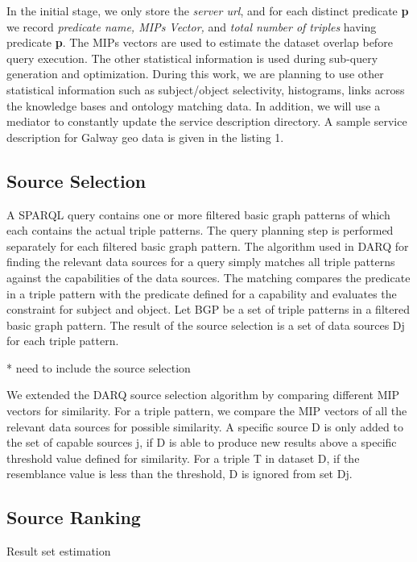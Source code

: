 \documentclass{sig-alternate}  %
\begin{document}
In the initial stage, we only store the\textit{ server url}, and for
each distinct predicate \textbf{p} we record \textit{predicate name,
MIPs Vector,} and \textit{total number of triples} having predicate
\textbf{p}. The MIPs vectors are used to estimate the dataset overlap
before query execution. The other statistical information is used
during sub-query generation and optimization. During this work, we
are planning to use other statistical information such as subject/object
selectivity, histograms, links across the knowledge bases and ontology
matching data. In addition, we will use a mediator to constantly update
the service description directory. A sample service description for
Galway geo data is given in the listing 1.



\subsection{Source Selection}
A SPARQL query contains one or more filtered basic graph patterns
of which each contains the actual triple patterns. The query planning
step is performed separately for each filtered basic graph pattern.
The algorithm used in DARQ for finding the relevant data sources for
a query simply matches all triple patterns against the capabilities
of the data sources. The matching compares the predicate in a triple
pattern with the predicate defined for a capability and evaluates
the constraint for subject and object. Let BGP be a set of triple
patterns in a filtered basic graph pattern. The result of the source
selection is a set of data sources Dj for each triple
pattern.

* need to include the source selection

We extended the DARQ source selection algorithm by comparing different
MIP vectors for similarity. For a triple pattern, we compare the MIP
vectors of all the relevant data sources for possible similarity.
A specific source D is only added to the set of capable sources j,
if D is able to produce new results above a specific threshold value
defined for similarity. For a triple T in dataset D, if the resemblance
value is less than the threshold, D is ignored from set Dj.


\subsection{Source Ranking}
Result set estimation       
\end{document}
